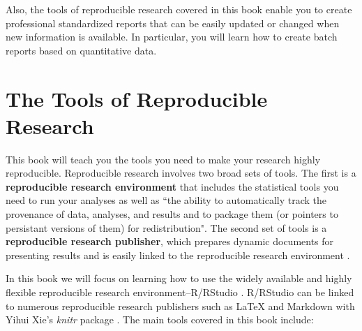 Also, the tools of reproducible research covered in this book enable you to create professional standardized reports that can be easily updated or changed when new information is available. In particular, you will learn how to create batch reports based on quantitative data.


\section{The Tools of Reproducible Research}

This book will teach you the tools you need to make your research highly reproducible. Reproducible research involves two broad sets of tools. The first is a {\bf{reproducible research     environment}} that includes the statistical tools you need to run your analyses as well as ``the ability to automatically track the provenance of data, analyses, and results and to package them (or pointers to persistant versions of them) for redistribution". The second set of tools is a {\bf{reproducible research publisher}}, which prepares dynamic documents for presenting results and is easily linked to the reproducible research environment \cite[415]{Mesirov2010}.

In this book we will focus on learning how to use the widely available and highly flexible reproducible research environment--R/RStudio \cite[]{RLanguage,RStudioCite}. R/RStudio can be linked to numerous reproducible research publishers such as LaTeX and Markdown with Yihui Xie's {\emph{knitr}} package \citeyearpar{R-knitr}. The main tools covered in this book include:


